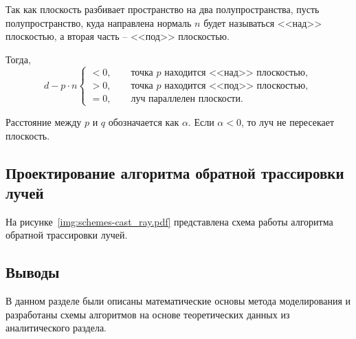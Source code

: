 Так как плоскость разбивает пространство на два полупространства, пусть полупространство, куда направлена нормаль $n$ будет называться <<над>> плоскостью, а вторая часть -- <<под>> плоскостью.

Тогда,
\begin{equation}
	d - p\cdot n \begin{cases}
		< 0,\qquad \text{точка $p$ находится <<над>> плоскостью},\\ 
		> 0,\qquad \text{точка $p$ находится <<под>> плоскостью},\\
		= 0,\qquad \text{луч параллелен плоскости}.
	\end{cases}
\end{equation}

Расстояние между $p$ и $q$ обозначается как $\alpha$. Если $\alpha < 0$, то луч не пересекает плоскость.

\subsection{Проектирование алгоритма обратной трассировки лучей}
На рисунке~\ref{img:schemes-cast_ray.pdf} представлена схема работы алгоритма обратной трассировки лучей. 

\subsection*{Выводы}
В данном разделе были описаны математические основы метода моделирования и разработаны схемы алгоритмов на основе теоретических данных из аналитического раздела.


\newpage